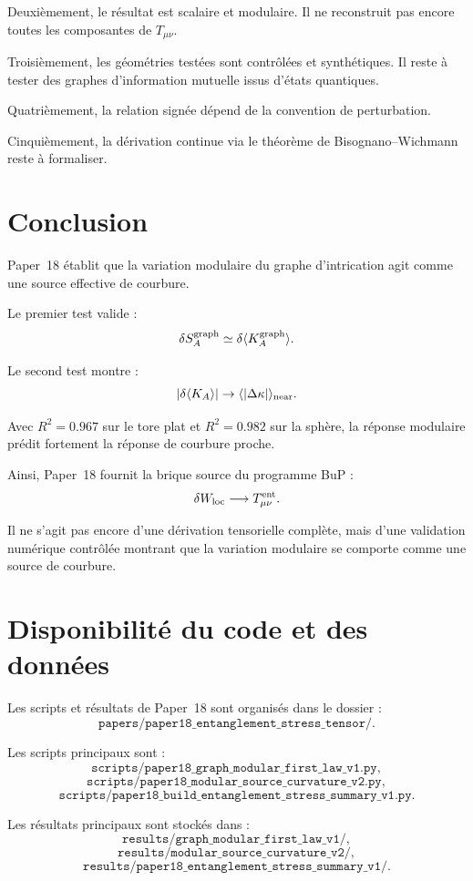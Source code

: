 \documentclass[11pt,a4paper]{article}
\begin{document}
Deuxièmement, le résultat est scalaire et modulaire. Il ne reconstruit pas
encore toutes les composantes de \(T_{\mu\nu}\).

Troisièmement, les géométries testées sont contrôlées et synthétiques. Il
reste à tester des graphes d'information mutuelle issus d'états quantiques.

Quatrièmement, la relation signée dépend de la convention de perturbation.

Cinquièmement, la dérivation continue via le théorème de
Bisognano--Wichmann reste à formaliser.

\section{Conclusion}

Paper~18 établit que la variation modulaire du graphe d'intrication agit comme
une source effective de courbure.

Le premier test valide :
\[
\delta S_A^{\rm graph}
\simeq
\delta\langle K_A^{\rm graph}\rangle.
\]

Le second test montre :
\[
|\delta\langle K_A\rangle|
\to
\langle|\Delta\kappa|\rangle_{\rm near}.
\]

Avec \(R^2=0.967\) sur le tore plat et \(R^2=0.982\) sur la sphère, la réponse
modulaire prédit fortement la réponse de courbure proche.

Ainsi, Paper~18 fournit la brique source du programme BuP :
\[
\delta W_{\rm loc}
\longrightarrow
T_{\mu\nu}^{\rm ent}.
\]

Il ne s'agit pas encore d'une dérivation tensorielle complète, mais d'une
validation numérique contrôlée montrant que la variation modulaire se comporte
comme une source de courbure.

\section*{Disponibilité du code et des données}

Les scripts et résultats de Paper~18 sont organisés dans le dossier :
\[
\texttt{papers/paper18\_entanglement\_stress\_tensor/}.
\]

Les scripts principaux sont :
\[
\texttt{scripts/paper18\_graph\_modular\_first\_law\_v1.py},
\]
\[
\texttt{scripts/paper18\_modular\_source\_curvature\_v2.py},
\]
\[
\texttt{scripts/paper18\_build\_entanglement\_stress\_summary\_v1.py}.
\]

Les résultats principaux sont stockés dans :
\[
\texttt{results/graph\_modular\_first\_law\_v1/},
\]
\[
\texttt{results/modular\_source\_curvature\_v2/},
\]
\[
\texttt{results/paper18\_entanglement\_stress\_summary\_v1/}.
\]
\end{document}
